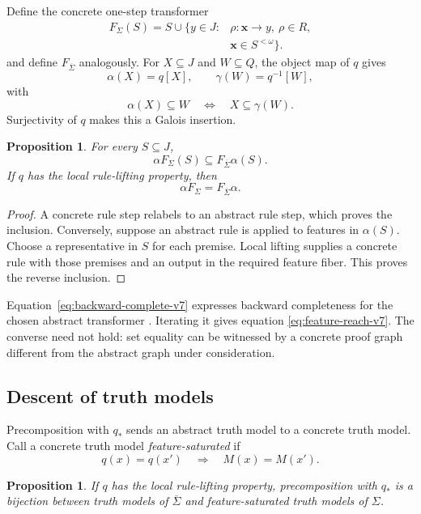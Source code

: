 \documentclass[10pt,journal,a4paper]{IEEEtran}
\newtheorem{proposition}[theorem]{Proposition}
\theoremstyle{definition}
\begin{document}
Define the concrete one-step transformer
\[
\begin{aligned}
  F_\Sigma(S)=S\cup\bigl\{y\in J:{}&
  \rho:\mathbf x\to y,\ \rho\in R,\\
  &\mathbf x\in S^{<\omega}\bigr\}.
\end{aligned}
\]
and define $F_{\overline\Sigma}$ analogously. For $X\subseteq J$ and $W\subseteq Q$, the object map of $q$ gives
\[
  \alpha(X)=q[X],
  \qquad
  \gamma(W)=q^{-1}[W],
\]
with
\[
  \alpha(X)\subseteq W
  \quad\Longleftrightarrow\quad
  X\subseteq\gamma(W).
\]
Surjectivity of $q$ makes this a Galois insertion.

\begin{proposition}
For every $S\subseteq J$,
\[
  \alpha F_\Sigma(S)
  \subseteq
  F_{\overline\Sigma}\alpha(S).
\]
If $q$ has the local rule-lifting property, then
\begin{equation}\label{eq:backward-complete-v7}
  \alpha F_\Sigma
  =
  F_{\overline\Sigma}\alpha.
\end{equation}
\end{proposition}

\begin{proof}
A concrete rule step relabels to an abstract rule step, which proves the inclusion. Conversely, suppose an abstract rule is applied to features in $\alpha(S)$. Choose a representative in $S$ for each premise. Local lifting supplies a concrete rule with those premises and an output in the required feature fiber. This proves the reverse inclusion.
\end{proof}

Equation~\eqref{eq:backward-complete-v7} expresses backward completeness for the chosen abstract transformer \cite{GiacobazziRanzatoScozzari2000}. Iterating it gives equation \eqref{eq:feature-reach-v7}. The converse need not hold: set equality can be witnessed by a concrete proof graph different from the abstract graph under consideration.

\subsection{Descent of truth models}

Precomposition with $q_*$ sends an abstract truth model to a concrete truth model. Call a concrete truth model \emph{feature-saturated} if
\[
  q(x)=q(x')
  \quad\Longrightarrow\quad
  M(x)=M(x').
\]

\begin{proposition}
If $q$ has the local rule-lifting property, precomposition with $q_*$ is a bijection between truth models of $\overline\Sigma$ and feature-saturated truth models of $\Sigma$.
\end{proposition}
\end{document}
